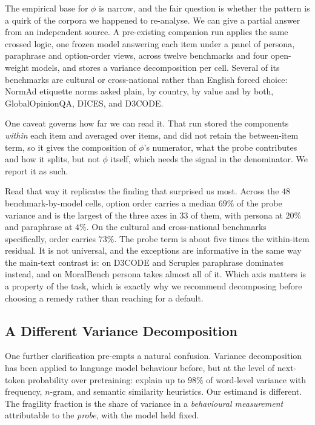 \documentclass[11pt]{article}
\begin{document}
The empirical base for $\phi$ is narrow, and the fair question is whether the
pattern is a quirk of the corpora we happened to re-analyse. We can give a
partial answer from an independent source. A pre-existing companion run applies the
same crossed logic, one frozen model answering each item under a panel of
persona, paraphrase and option-order views, across twelve benchmarks and four
open-weight models, and stores a variance decomposition per cell. Several of its
benchmarks are cultural or cross-national rather than English forced choice:
NormAd etiquette norms asked plain, by country, by value and by both,
GlobalOpinionQA, DICES, and D3CODE.

One caveat governs how far we can read it. That run stored the components
\emph{within} each item and averaged over items, and did not retain the
between-item term, so it gives the composition of $\phi$'s numerator, what the
probe contributes and how it splits, but not $\phi$ itself, which needs the
signal in the denominator. We report it as such.

Read that way it replicates the finding that surprised us most. Across the $48$
benchmark-by-model cells, option order carries a median $69\%$ of the probe
variance and is the largest of the three axes in $33$ of them, with persona at
$20\%$ and paraphrase at $4\%$. On the cultural and cross-national benchmarks
specifically, order carries $73\%$. The probe term is about five times the
within-item residual. It is not universal, and the exceptions are informative in
the same way the main-text contrast is: on D3CODE and Scruples paraphrase
dominates instead, and on MoralBench persona takes almost all of it. Which axis
matters is a property of the task, which is exactly why we recommend decomposing
before choosing a remedy rather than reaching for a default.

\subsection{A Different Variance Decomposition}
\label{app:altdecomp}

One further clarification pre-empts a natural confusion. Variance decomposition
has been applied to language model behaviour before, but at the level of
next-token probability over pretraining: \citet{michaelov2025phases} explain up
to $98\%$ of word-level variance with frequency, $n$-gram, and semantic
similarity heuristics. Our estimand is different. The fragility fraction is the
share of variance in a \emph{behavioural measurement} attributable to the
\emph{probe}, with the model held fixed.
\end{document}
